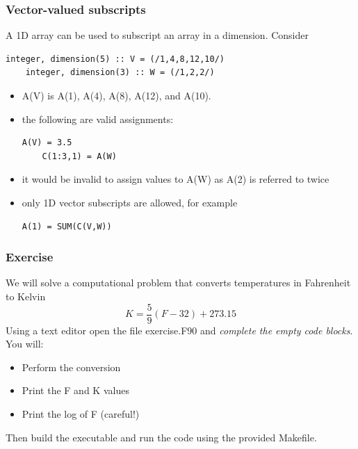 \documentclass[11pt]{beamer}
\begin{document}
\begin{frame}[fragile]
\frametitle{Vector-valued subscripts}

\footnotesize{
A 1D array can be used to subscript an array in a dimension. Consider
\begin{lstlisting}[style=Fortran]
    integer, dimension(5) :: V = (/1,4,8,12,10/)
    integer, dimension(3) :: W = (/1,2,2/)
 \end{lstlisting}
\begin{itemize}
\item A(V) is A(1), A(4), A(8), A(12), and A(10).
\item the following are valid assignments:
\begin{lstlisting}[style=Fortran]
    A(V) = 3.5
    C(1:3,1) = A(W)
 \end{lstlisting}
\item it would be invalid to assign values to A(W) as A(2) is referred to twice
\item only 1D vector subscripts are allowed, for example
\begin{lstlisting}[style=Fortran]
    A(1) = SUM(C(V,W))
 \end{lstlisting}
 \end{itemize}
}

\end{frame}



\begin{frame}[fragile]
\frametitle{Exercise}

We will solve a computational problem that converts temperatures in Fahrenheit to Kelvin\\
\begin{equation}
K = \frac{5}{9}(F - 32) + 273.15
\end{equation}
Using a text editor open the file exercise.F90 and \emph{complete the empty code blocks}. You will:
\begin{itemize}
\item Perform the conversion
\item Print the F and K values
\item Print the log of F (careful!)
 \end{itemize}
Then build the executable and run the code using the provided Makefile.

\end{frame}
\end{document}
